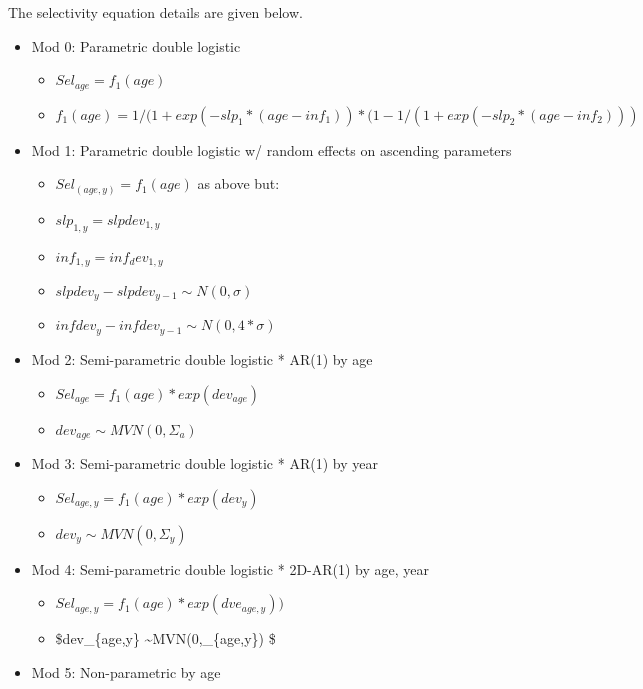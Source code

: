 \documentclass[
]{article}
\providecommand{\tightlist}{%
  \setlength{\itemsep}{0pt}\setlength{\parskip}{0pt}}
\begin{document}
The selectivity equation details are given below.

\begin{itemize}
\tightlist
\item
  Mod 0: Parametric double logistic

  \begin{itemize}
  \tightlist
  \item
    \(Sel_{age}= f_1 (age)\)
  \item
    \(f_1 (age) = 1/(1+exp(-slp_1*(age-inf_1))*(1-1/(1+exp(-slp_2*(age-inf_2)))\)
  \end{itemize}
\item
  Mod 1: Parametric double logistic w/ random effects on ascending
  parameters

  \begin{itemize}
  \tightlist
  \item
    \(Sel_{(age,y)} = f_1(age)\) as above but:
  \item
    \(slp_{1,y}=slpdev_{1,y}\)
  \item
    \(inf_{1,y}=inf_dev_{1,y}\)
  \item
    \(slpdev_y-slpdev_{y-1} \sim N(0,\sigma )\)
  \item
    \(infdev_y-infdev_{y-1} \sim N(0,4*\sigma )\)
  \end{itemize}
\item
  Mod 2: Semi-parametric double logistic * AR(1) by age

  \begin{itemize}
  \tightlist
  \item
    \(Sel_{age} = f_1(age)*exp(dev_{age})\)
  \item
    \(dev_{age} \sim MVN(0,\Sigma_a)\)
  \end{itemize}
\item
  Mod 3: Semi-parametric double logistic * AR(1) by year

  \begin{itemize}
  \tightlist
  \item
    \(Sel_{age,y}= f_1 (age)*exp⁡(dev_y)\)
  \item
    \(dev_y \sim MVN(0,\Sigma _y)\)
  \end{itemize}
\item
  Mod 4: Semi-parametric double logistic * 2D-AR(1) by age, year

  \begin{itemize}
  \tightlist
  \item
    \(Sel_{age,y}= f_1 (age)*exp⁡(dve_{age,y}))\)
  \item
    \$dev\_\{age,y\} \sim MVN(0,\Sigma \_\{age,y\}) \$
  \end{itemize}
\item
  Mod 5: Non-parametric by age


\end{itemize}
\end{document}
